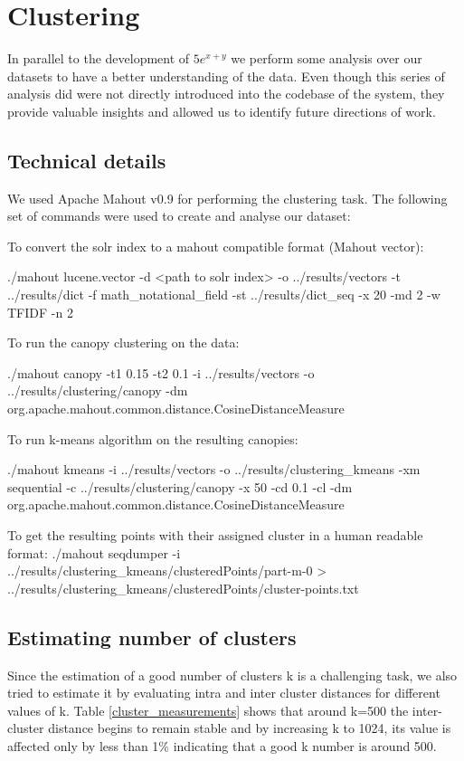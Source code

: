 \chapter{Clustering}
\label{chap-clustering}

In parallel to the development of $5e^{x+y}$ we perform some analysis over our datasets to have a better understanding of the data. Even though this series of analysis did were not directly introduced into the codebase of the system, they provide valuable insights and allowed us to identify future directions of work.

\section{Technical details}

We used Apache Mahout v0.9\cite{mahout} for performing the clustering task. 
The following set of commands were used to create and analyse our dataset:

To convert the solr index to a mahout compatible format (Mahout vector):

\small{{\codefont ./mahout lucene.vector -d <path to solr index>  -o ../results/vectors -t ../results/dict -f math\_notational\_field -st ../results/dict\_seq -x 20 -md 2 -w TFIDF -n 2}}

To run the canopy clustering on the data:

\small{{\codefont ./mahout canopy -t1 0.15 -t2 0.1 -i ../results/vectors -o ../results/clustering/canopy -dm org.apache.mahout.common.distance.CosineDistanceMeasure}}

To run k-means algorithm on the resulting canopies:

\small{{\codefont ./mahout kmeans -i ../results/vectors -o ../results/clustering\_kmeans -xm sequential  -c ../results/clustering/canopy -x 50 -cd 0.1 -cl -dm org.apache.mahout.common.distance.CosineDistanceMeasure}}

To get the resulting points with their assigned cluster in a human readable format:
\small{{\codefont ./mahout seqdumper -i ../results/clustering\_kmeans/clusteredPoints/part-m-0 > ../results/clustering\_kmeans/clusteredPoints/cluster-points.txt}}

\section{Estimating number of clusters}

Since the estimation of a good number of clusters k is a challenging task, we also tried to estimate it  by evaluating intra and inter cluster distances for different values of k. Table \ref{cluster_measurements} shows that around k=500 the inter-cluster distance begins to remain stable and by increasing k to 1024, its value is affected only by less than 1\% indicating that a good k number is around 500.

